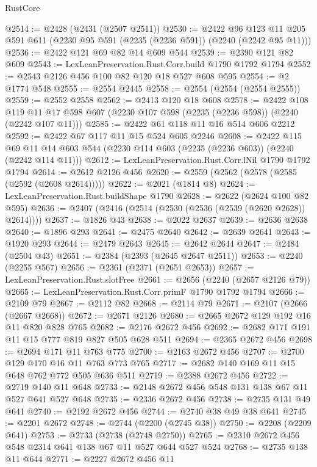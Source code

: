 \begin{lexlean}{RustCore}
\begin{coremodule}
@2514 := @2428 (@2431 (@2507 @2511))
@2530 := @2422
    @96
    @123
    @11
    @205
    @591
    @611
    (@2230 @95 @591 (@2235 (@2236 @591)) (@2240 (@2242 @95 @11)))
@2536 := @2422 @121 @69 @82 @14 @609 @544
@2539 := @2390 @121 @82 @609
@2543 := LexLeanPreservation.Rust.Corr.build @1790 @1792 @1794
@2552 := @2543 @2126 @456 @100 @82 @120 @18 @527 @608 @595
@2554 := @2 @1774 @548
@2555 := @2554 @2445
@2558 := @2554 (@2554 (@2554 @2555))
@2559 := @2552 @2558
@2562 := @2413 @120 @18 @608
@2578 := @2422
    @108
    @119
    @11
    @17
    @598
    @607
    (@2230 @107 @598 (@2235 (@2236 @598)) (@2240 (@2242 @107 @11)))
@2585 := @2422 @61 @118 @11 @16 @514 @606 @2212
@2592 := @2422 @67 @117 @11 @15 @524 @605 @2246
@2608 := @2422
    @115
    @69
    @11
    @14
    @603
    @544
    (@2230 @114 @603 (@2235 (@2236 @603)) (@2240 (@2242 @114 @11)))
@2612 := LexLeanPreservation.Rust.Corr.lNil @1790 @1792 @1794
@2614 := @2612 @2126 @456
@2620 := @2559 (@2562 (@2578 (@2585 (@2592 (@2608 @2614)))))
@2622 := @2021 (@1814 @8)
@2624 := LexLeanPreservation.Rust.buildShape @1790
@2628 := @2622 (@2624 @100 @82 @595)
@2636 := @2407 (@2416 (@2514 (@2530 (@2536 (@2539 (@2620 @2628)) @2614))))
@2637 := @1826 @43
@2638 := @2022 @2637
@2639 := @2636 @2638
@2640 := @1896 @293
@2641 := @2475 @2640
@2642 := @2639 @2641
@2643 := @1920 @293
@2644 := @2479 @2643
@2645 := @2642 @2644
@2647 := @2484 (@2504 @43)
@2651 := @2384 (@2393 (@2645 @2647 @2511))
@2653 := @2240 (@2255 @567)
@2656 := @2361 (@2371 (@2651 @2653))
@2657 := LexLeanPreservation.Rust.slotFree
@2661 := @2656 (@2240 (@2657 @2126 @79))
@2665 := LexLeanPreservation.Rust.Corr.primF @1790 @1792 @1794
@2666 := @2109 @79
@2667 := @2112 @82
@2668 := @2114 @79
@2671 := @2107 (@2666 (@2667 @2668))
@2672 := @2671 @2126
@2680 := @2665 @2672 @129 @192 @16 @11 @820 @828 @765
@2682 := @2176 @2672 @456
@2692 := @2682 @171 @191 @11 @15 @777 @819 @827 @505 @628 @511
@2694 := @2365 @2672 @456
@2698 := @2694 @171 @11 @763 @775
@2700 := @2163 @2672 @456
@2707 := @2700 @129 @170 @16 @11 @763 @773 @765
@2717 := @2682 @140 @169 @11 @15 @648 @762 @772 @505 @636 @511
@2719 := @2388 @2672 @456
@2722 := @2719 @140 @11 @648
@2733 := @2148 @2672 @456 @548 @131 @138 @67 @11 @527 @641 @527 @648
@2735 := @2336 @2672 @456
@2738 := @2735 @131 @49 @641
@2740 := @2192 @2672 @456
@2744 := @2740 @38 @49 @38 @641
@2745 := @2201 @2672
@2748 := @2744 (@2200 (@2745 @38))
@2750 := @2208 (@2209 @641)
@2753 := @2733 (@2738 (@2748 @2750))
@2765 := @2310 @2672 @456 @548 @2314 @641 @138 @67 @11 @527 @644 @527 @524
@2768 := @2735 @138 @11 @644
@2771 := @2227 @2672 @456 @11

\end{coremodule}
\end{lexlean}
